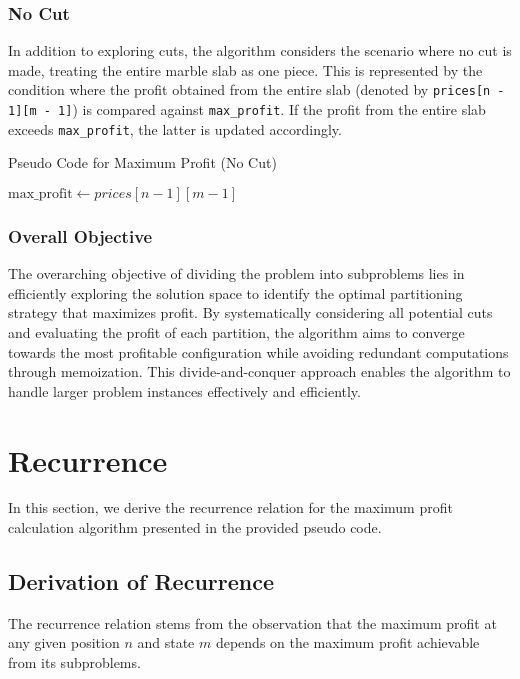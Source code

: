 \documentclass{article}
\begin{document}
\subsubsection{No Cut}

In addition to exploring cuts, the algorithm considers the scenario where no cut is made, treating the entire marble slab as one piece. This is represented by the condition where the profit obtained from the entire slab (denoted by \texttt{prices[n - 1][m - 1]}) is compared against \texttt{max\_profit}. If the profit from the entire slab exceeds \texttt{max\_profit}, the latter is updated accordingly.

\begin{algorithm}
\caption{Pseudo Code for Maximum Profit (No Cut)}
\begin{algorithmic}[1]
    \State $\text{max\_profit} \gets prices[n - 1][m- 1]$
\EndIf
\end{algorithmic}
\end{algorithm}


\subsubsection{Overall Objective}

The overarching objective of dividing the problem into subproblems lies in efficiently exploring the solution space to identify the optimal partitioning strategy that maximizes profit. By systematically considering all potential cuts and evaluating the profit of each partition, the algorithm aims to converge towards the most profitable configuration while avoiding redundant computations through memoization. This divide-and-conquer approach enables the algorithm to handle larger problem instances effectively and efficiently.



\section{Recurrence}

In this section, we derive the recurrence relation for the maximum profit calculation algorithm presented in the provided pseudo code. 

\subsection{Derivation of Recurrence}

The recurrence relation stems from the observation that the maximum profit at any given position \( n \) and state \( m \) depends on the maximum profit achievable from its subproblems. 
\end{document}
